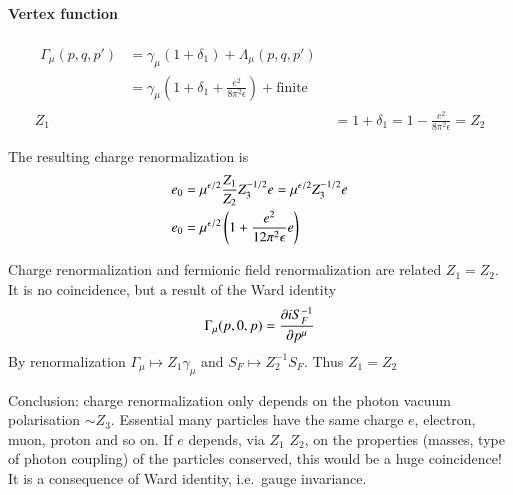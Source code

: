 \paragraph{Vertex function}
\begin{align}
   \begin{split}
    \Gamma_\mu(p, q, p') &= \gamma_\mu (1+\delta_1) + \Lambda_\mu (p,q, p') \\
                        &= \gamma_\mu (1+\delta_1 + \frac{e^2}{8\pi^2 \epsilon}) + \text{finite}
   \end{split}\\
   Z_1 &= 1 + \delta_1 = 1 - \frac{e^2}{8\pi^2 \epsilon} = Z_2
\end{align}

The resulting charge renormalization is
\begin{align}
   e_0 &= \mu^{\epsilon/2} \frac{Z_1}{Z_2} Z_3^{-1/2} e = \mu^{\epsilon/2} Z_3^{-1/2} e  \notag \\
   e_0 &= \mu^{\epsilon/2} \left( 1+\frac{e^2}{12 \pi^2 \epsilon} e \right)
\end{align}

Charge renormalization and fermionic field renormalization are related $Z_1 = Z_2$. It is no coincidence, but a result of the Ward identity
\begin{align*}
   \Gamma_\mu (p, 0, p) = \pdv{iS_F^{-1}}{p^\mu}
\end{align*}
By renormalization $\Gamma_\mu \mapsto Z_1 \gamma_\mu$ and $S_F \mapsto Z_2^{-1} S_F$. Thus $Z_1 = Z_2$

Conclusion: charge renormalization only depends on the photon vacuum polarisation $\sim Z_3$. Essential many particles have the same charge $e$, electron, muon, proton and so on. If $e$ depends, via $Z_1$ $Z_2$, on the properties (masses, type of photon coupling) of the particles conserved, this would be a huge coincidence! It is a consequence of Ward identity, i.e.~gauge invariance.

